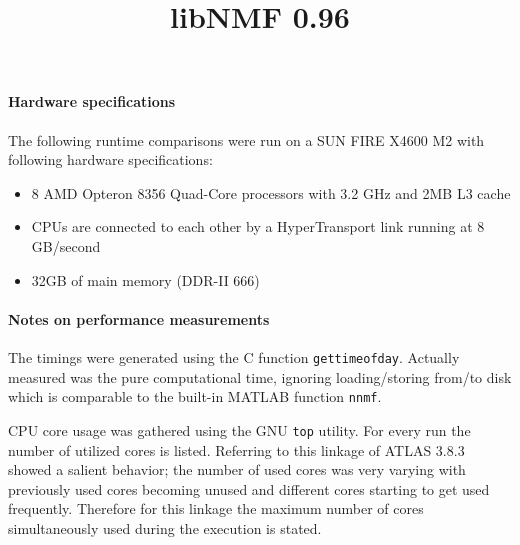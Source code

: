 \documentclass[a4paper,10pt]{scrartcl}
\title{libNMF 0.96}
\begin{document}
\fancyhead{}


\maketitle

	\paragraph{Hardware specifications}


	The following runtime comparisons were run on a SUN FIRE X4600 M2 with following hardware specifications:
	\newline

	\begin{itemize}
	\item	8 AMD Opteron 8356 Quad-Core processors with 3.2 GHz and 2MB L3 cache
	\item	CPUs are connected to each other by a HyperTransport link running at 8 GB/second
	\item	32GB of main memory (DDR-II 666)
	\end{itemize}


	\paragraph{Notes on performance measurements}

	The timings were generated using the C function \texttt{gettimeofday}. Actually measured was the pure computational time, ignoring loading/storing from/to disk which is comparable to the built-in MATLAB function \texttt{nnmf}.


	CPU core usage was gathered using the GNU \texttt{top} utility. For every run the number of utilized cores is listed. Referring to this linkage of ATLAS 3.8.3 showed a salient behavior; the number of used cores was very varying with previously used cores becoming unused and different cores starting to get used frequently. Therefore for this linkage the maximum number of cores simultaneously used during the execution is stated.
	
	
	
\end{document}
